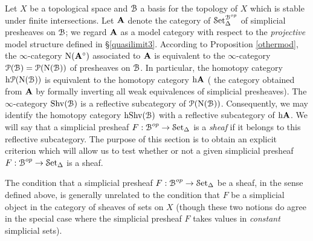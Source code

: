 Let $X$ be a topological space and $\operatorname{\mathcal{B}}$ a basis for the topology
of $X$ which is stable under finite intersections. Let ${\mathbf A}$ denote the category
of $\operatorname{\mathcal{S}et}_{\Delta}^{\operatorname{\mathcal{B}}^{op}}$ of simplicial presheaves on $\operatorname{\mathcal{B}}$; we regard
${\mathbf A}$ as a model category with respect to the {\em projective} model structure defined in \S \ref{quasilimit3}. According to Proposition \ref{othermod}, the $\infty$-category $\operatorname{N} ({\mathbf A}^{\circ})$ associated to ${\mathbf A}$ is equivalent to the $\infty$-category 
$\operatorname{\mathcal{P}}(\operatorname{\mathcal{B}}) = \operatorname{\mathcal{P}}( \operatorname{N}(\operatorname{\mathcal{B}}))$ of presheaves on $\operatorname{\mathcal{B}}$. In particular, the homotopy category
$\rm{h} \it{\operatorname{\mathcal{P}}( \operatorname{N}(\operatorname{\mathcal{B}}))}$ is equivalent to the homotopy category $\rm{h} \it{{\mathbf A}}$ ( the category obtained from ${\mathbf A}$ by formally inverting all weak equivalences of simplicial presheaves). The $\infty$-category $\operatorname{Shv}(\operatorname{\mathcal{B}})$ is a reflective subcategory of $\operatorname{\mathcal{P}}(\operatorname{N}(\operatorname{\mathcal{B}}))$. Consequently, we may identify the homotopy category $\rm{h} \it{\operatorname{Shv}(\operatorname{\mathcal{B}})}$ with a reflective subcategory of $\rm{h} \it{{\mathbf A}}$. We will say that a simplicial presheaf $F: \operatorname{\mathcal{B}}^{op} \rightarrow \operatorname{\mathcal{S}et_{\Delta}}$ is a {\it sheaf} if it belongs to this reflective subcategory. The purpose of this section is to obtain an explicit criterion which will allow us to test whether or not a given simplicial presheaf $F: \operatorname{\mathcal{B}}^{op} \rightarrow \operatorname{\mathcal{S}et_{\Delta}}$ is a sheaf.

\begin{warning}
The condition that a simplicial presheaf $F: \operatorname{\mathcal{B}}^{op} \rightarrow \operatorname{\mathcal{S}et_{\Delta}}$ be a sheaf, in the sense defined above, is generally unrelated to the condition that $F$ be a simplicial object in the category of sheaves of sets on $X$ (though these two notions do agree in the special case where the simplicial presheaf $F$ takes values in {\em constant} simplicial sets).
\end{warning}

